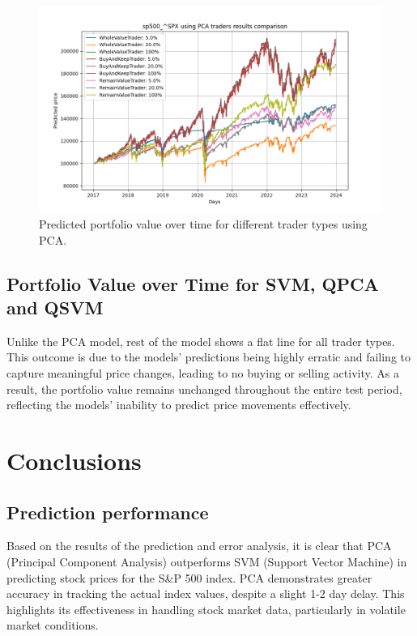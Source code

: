 \documentclass[journal]{IEEEtran}
\begin{document}
\begin{figure}[ht!]
    \centering
    \includegraphics[width=\linewidth]{pca_traders.png}
    \caption{Predicted portfolio value over time for different trader types using PCA.}
    \label{fig:pca_trader_portfolio}
\end{figure}

\subsection{Portfolio Value over Time for SVM, QPCA and QSVM}

Unlike the PCA model, rest of the model shows a flat line for all trader types. This outcome is due to the models' predictions being highly erratic and failing to capture meaningful price changes, leading to no buying or selling activity. As a result, the portfolio value remains unchanged throughout the entire test period, reflecting the models' inability to predict price movements effectively.

\section{Conclusions}

\subsection{Prediction performance}

Based on the results of the prediction and error analysis, it is clear that PCA (Principal Component Analysis) outperforms SVM (Support Vector Machine) in predicting stock prices for the S\&P 500 index. PCA demonstrates greater accuracy in tracking the actual index values, despite a slight 1-2 day delay. This highlights its effectiveness in handling stock market data, particularly in volatile market conditions.
\end{document}
